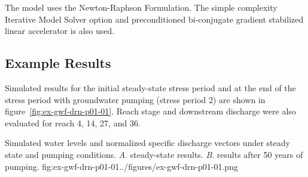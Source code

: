 The model uses the Newton-Raphson Formulation. The simple complexity Iterative Model Solver option and preconditioned bi-conjugate gradient stabilized linear accelerator is also used.

\subsection{Example Results}

Simulated results for the initial steady-state stress period and at the end of the stress period with groundwater pumping (stress period 2) are shown in figure~\ref{fig:ex-gwf-drn-p01-01}. Reach stage and downstream discharge were also evaluated for reach 4, 14, 27, and 36.

\begin{StandardFigure}{
                                     Simulated water levels and normalized specific discharge vectors  
                                     under steady state and pumping conditions. 
                                     \textit{A}. steady-state results.
                                     \textit{B}. results after 50 years of pumping.
                                     }{fig:ex-gwf-drn-p01-01}{../figures/ex-gwf-drn-p01-01.png}
\end{StandardFigure}                                 


